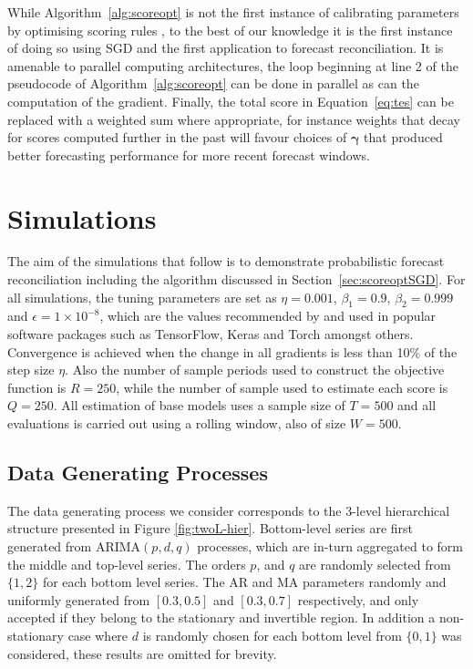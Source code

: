 \documentclass[12pt]{article}
\theoremstyle{definition}
\begin{document}
While Algorithm~\ref{alg:scoreopt} is not the first instance of calibrating parameters by optimising scoring rules \citep[see][for an example]{gneiting2005}, to the best of our knowledge it is the first instance of doing so using SGD and the first application to forecast reconciliation.  It is amenable to parallel computing architectures, the loop beginning at line 2 of the pseudocode of Algorithm~\ref{alg:scoreopt} can be done in parallel as can the computation of the gradient.  Finally, the total score in Equation~\ref{eq:tes} can be replaced with a weighted sum where appropriate, for instance weights that decay for scores computed further in the past will favour choices of $\bm{\gamma}$ that produced better forecasting performance for more recent forecast windows.

\section{Simulations}\label{sec:simulations}

The aim of the simulations that follow is to demonstrate probabilistic forecast reconciliation including the algorithm discussed in Section~\ref{sec:scoreoptSGD}.  For all simulations, the tuning parameters are set as $\eta=0.001$, $\beta_1=0.9$, $\beta_2=0.999$ and $\epsilon=1\times 10^{-8}$, which are the values recommended by \cite{kingma2014} and used in popular software packages such as TensorFlow, Keras and Torch amongst others.  Convergence is achieved when the change in all gradients is less than 10\% of the step size $\eta$.  Also the number of sample periods used to construct the objective function is $R=250$, while the number of sample used to estimate each score is $Q=250$.  All estimation of base models uses a sample size of $T=500$ and all evaluations is carried out using a rolling window, also of size $W=500$.  

\subsection{Data Generating Processes}\label{sec:dgp}

The data generating process we consider corresponds to the 3-level hierarchical structure presented in Figure \ref{fig:twoL-hier}. Bottom-level series are first generated from ARIMA$(p,d,q)$ processes, which are in-turn aggregated to form the middle and top-level series. The orders $p$, and $q$ are randomly selected from $\{1,2\}$ for each bottom level series. The AR and MA parameters randomly and uniformly generated from $[0.3,0.5]$ and $[0.3,0.7]$ respectively, and only accepted if they belong to the stationary and invertible region.  In addition a non-stationary case where $d$ is randomly chosen for each bottom level from $\{0,1\}$ was considered, these results are omitted for brevity.
\end{document}
